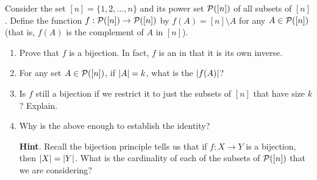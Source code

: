 \documentclass{book}
\begin{document}
\setcounter{cpjt}{75}
\addtocounter{cpjt}{-1}
\begin{activity}\label{act-pascalsym-bij}
\hypertarget{p-564}{}%
Consider the set \([n] = \{1,2,\ldots,n\}\) and its power set \(\mathcal P([n])\) of all subsets of \([n]\).  Define the function \(f:\mathcal P([n]) \to \mathcal P([n])\) by \(f(A) = [n]\setminus A\) for any \(A \in \mathcal P([n])\) (that is, \(f(A)\) is the complement of \(A\) in \([n]\)).%
\begin{enumerate}[font=\bfseries,label=(\alph*),ref=\alph*]
\item\label{task-105} \hypertarget{p-565}{}%
Prove that \(f\) is a bijection.  In fact, \(f\) is an  in that it is its own inverse.%
\item\label{task-106} \hypertarget{p-566}{}%
For any set \(A \in \mathcal P([n])\), if \(\left| A \right| = k\), what is the \(\left| f(A) \right|\)?%
\item\label{task-107} \hypertarget{p-567}{}%
Is \(f\) still a bijection if we restrict it to just the subsets of \([n]\) that have size \(k\)?  Explain.%
\item\label{task-108} \hypertarget{p-568}{}%
Why is the above enough to establish the identity?%
\par\smallskip%
\noindent\textbf{Hint}.\hypertarget{hint-31}{}\quad%
\hypertarget{p-569}{}%
Recall the bijection principle tells us that if \(f:X \to Y\) is a bijection, then \(\left| X \right| = \left| Y \right|\).  What is the cardinality of each of the subsets of \(\mathcal P([n])\) that we are considering?%
\end{enumerate}
\end{activity}

\clearpage
\end{document}
